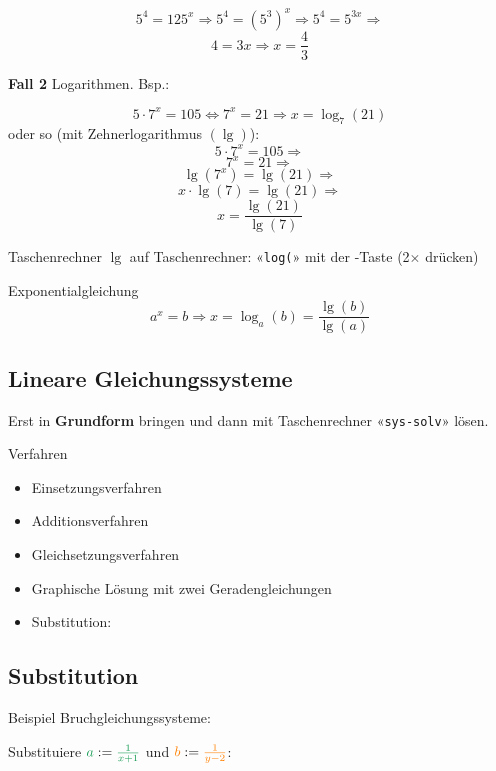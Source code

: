 \begin{multicols}{2}
$$5^4=125^x \Rightarrow{} 5^4=(5^3)^x \Rightarrow{} 5^4=5^{3x} \Rightarrow{}$$
$$ 4=3x \Rightarrow x=\frac43$$

\textbf{Fall 2} Logarithmen. Bsp.:

$$5\cdot{}7^x=105 \Leftrightarrow 7^x=21 \Rightarrow x=\log_7(21)$$
oder so (mit Zehnerlogarithmus $(\lg)$):
$$5\cdot{}7^x=105 \Rightarrow$$
$$7^x=21 \Rightarrow$$
$$ \lg(7^x)=\lg(21) \Rightarrow$$
$$x\cdot{}\lg(7)=\lg(21) \Rightarrow$$
$$ x=\frac{\lg(21)}{\lg(7)}$$

\begin{rezept}{Taschenrechner}{}
$\lg$ auf Taschenrechner: «\texttt{log(}» mit der -Taste (2$\times$ drücken)
\end{rezept}

\begin{gesetz*}{Exponentialgleichung}{}
$$a^x=b \Rightarrow{} x=\log_a(b) = \frac{\lg(b)}{\lg(a)}$$
\end{gesetz*}


\subsection*{Lineare Gleichungssysteme}
Erst in \textbf{Grundform} bringen und dann
mit Taschenrechner «\texttt{sys-solv}»  lösen.

Verfahren
\begin{itemize}
\item Einsetzungsverfahren
\item Additionsverfahren
\item Gleichsetzungsverfahren
\item Graphische Lösung mit zwei Geradengleichungen
\item Substitution:
\end{itemize}

\subsection*{Substitution}
Beispiel Bruchgleichungssysteme:

Substituiere
${\color{ForestGreen}a}:={\color{ForestGreen}\frac1{x+1}}$ und
${\color{orange}b} : ={\color{orange}\frac1{y-2}}$:


\end{multicols}
